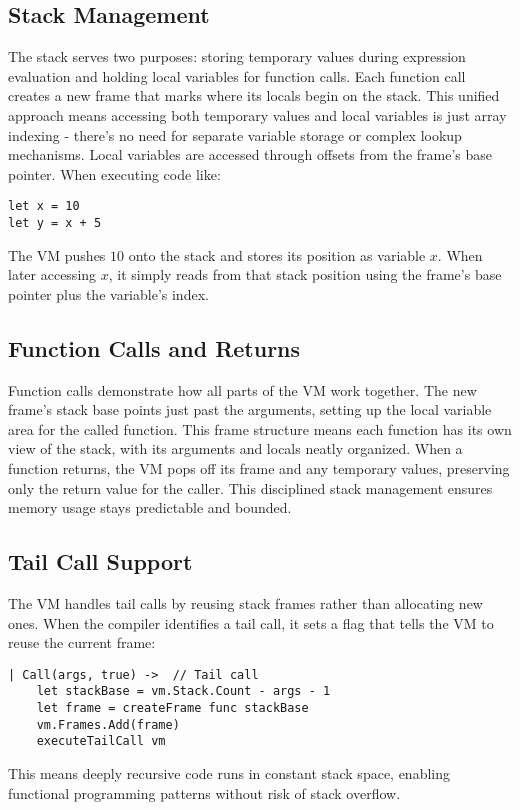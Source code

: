 \subsection{Stack Management}\label{subsec:stack-management}

The stack serves two purposes: storing temporary values during expression evaluation and holding local variables for function calls.
Each function call creates a new frame that marks where its locals begin on the stack.
This unified approach means accessing both temporary values and local variables is just array indexing - there's no need for separate variable storage or complex lookup mechanisms.
Local variables are accessed through offsets from the frame's base pointer.
When executing code like:

\begin{verbatim}
let x = 10
let y = x + 5
\end{verbatim}

The VM pushes $10$ onto the stack and stores its position as variable $x$.
When later accessing $x$, it simply reads 
from that stack position using the frame's base pointer plus the variable's index.

\subsection{Function Calls and Returns}\label{subsec:function-calls-and-returns}

Function calls demonstrate how all parts of the VM work together.
The new frame's stack base points just past the arguments, setting up the local variable area for the called function. 
This frame structure means each function has its own view of the stack, with its arguments and locals neatly organized.
When a function returns, the VM pops off its frame and any temporary values, preserving only the return value for the caller.
This disciplined stack management ensures memory usage stays predictable and bounded.

\subsection{Tail Call Support}\label{subsec:tail-call-support}

The VM handles tail calls by reusing stack frames rather than allocating new ones.
When the compiler identifies a tail call, it sets a flag that tells the VM to reuse the current frame:

\begin{verbatim}
| Call(args, true) ->  // Tail call
    let stackBase = vm.Stack.Count - args - 1
    let frame = createFrame func stackBase
    vm.Frames.Add(frame)
    executeTailCall vm
\end{verbatim}
This means deeply recursive code runs in constant stack space, enabling functional programming patterns without risk of stack overflow.


